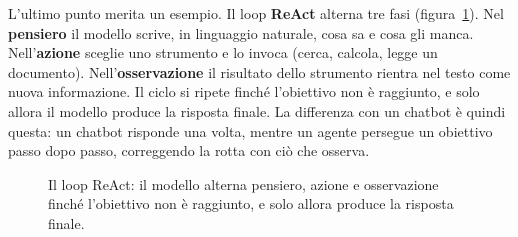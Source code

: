 L'ultimo punto merita un esempio. Il loop \textbf{ReAct} \cite{yao2022react} alterna tre fasi (figura~\ref{fig:react}). Nel \textbf{pensiero} il modello scrive, in linguaggio naturale, cosa sa e cosa gli manca. Nell'\textbf{azione} sceglie uno strumento e lo invoca (cerca, calcola, legge un documento). Nell'\textbf{osservazione} il risultato dello strumento rientra nel testo come nuova informazione. Il ciclo si ripete finché l'obiettivo non è raggiunto, e solo allora il modello produce la risposta finale. La differenza con un chatbot è quindi questa: un chatbot risponde una volta, mentre un agente persegue un obiettivo passo dopo passo, correggendo la rotta con ciò che osserva.

\begin{figure}[htbp]
\centering
{}
\caption{Il loop ReAct: il modello alterna pensiero, azione e osservazione finché l'obiettivo non è raggiunto, e solo allora produce la risposta finale.}
\label{fig:react}
\end{figure}

